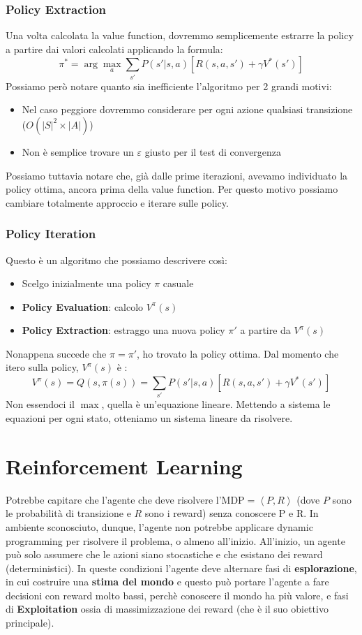 \subsubsection{Policy Extraction}
Una volta calcolata la value function, dovremmo semplicemente estrarre la policy a partire dai valori calcolati applicando la formula:
\begin{equation}
    \pi^* = \arg \max_a \sum_{s'} P(s' | s,a)[R(s,a,s') + \gamma V^*(s')]
\end{equation}
Possiamo però notare quanto sia inefficiente l'algoritmo per 2 grandi motivi:
\begin{itemize}
    \item Nel caso peggiore dovremmo considerare per ogni azione qualsiasi transizione ($O(|S|^2 \times |A|)$)
    \item Non è semplice trovare un $\varepsilon$ giusto per il test di convergenza
\end{itemize}
Possiamo tuttavia notare che, già dalle prime iterazioni, avevamo individuato la policy ottima, ancora prima della value function.
Per questo motivo possiamo cambiare totalmente approccio e iterare sulle policy.

\subsubsection{Policy Iteration}
Questo è un algoritmo che possiamo descrivere così:
\begin{itemize}
    \item Scelgo inizialmente una policy $\pi$ casuale
    \item \textbf{Policy Evaluation}: calcolo $V^\pi (s)$
    \item \textbf{Policy Extraction}: estraggo una nuova policy $\pi'$ a partire da $V^\pi (s)$
\end{itemize}
Nonappena succede che $\pi = \pi'$, ho trovato la policy ottima. Dal momento che itero sulla policy, $V^\pi(s)$ è :
\begin{equation}
    V^\pi(s) = Q(s,\pi(s)) = \sum_{s'} P(s' | s,a)[R(s,a,s') + \gamma V^*(s')]
\end{equation}
Non essendoci il $\max$, quella è un'equazione lineare. Mettendo a sistema le equazioni per ogni stato, otteniamo un sistema lineare
da risolvere.

\section{Reinforcement Learning}
Potrebbe capitare che l'agente che deve risolvere l'MDP$ = \left<P,R\right>$ (dove $P$ sono le probabilità di transizione e $R$ sono i reward)
senza conoscere P e R. In ambiente sconosciuto, dunque, l'agente non potrebbe applicare dynamic programming per risolvere il problema, o almeno all'inizio.
All'inizio, un agente può solo assumere che le azioni siano stocastiche e che esistano dei reward (deterministici). In queste
condizioni l'agente deve alternare fasi di \textbf{esplorazione}, in cui costruire una \textbf{stima del mondo} e questo può portare
l'agente a fare decisioni con reward molto bassi, perchè conoscere il mondo ha più valore, e fasi di \textbf{Exploitation} ossia di 
massimizzazione dei reward (che è il suo obiettivo principale).

